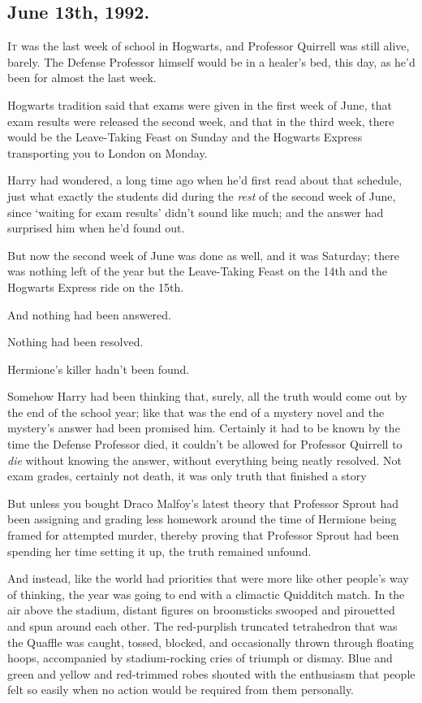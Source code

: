 
\subsection{June 13th, 1992.}

\lettrine{I}{t} was the last week of school in Hogwarts, and Professor Quirrell was still
alive, barely. The Defense Professor himself would be in a healer's bed, this
day, as he'd been for almost the last week.

Hogwarts tradition said that exams were given in the first week of June, that
exam results were released the second week, and that in the third week, there
would be the Leave-Taking Feast on Sunday and the Hogwarts Express transporting
you to London on Monday.

Harry had wondered, a long time ago when he'd first read about that schedule,
just what exactly the students did during the \emph{rest} of the second week of
June, since `waiting for exam results' didn't sound like much; and the answer
had surprised him when he'd found out.

But now the second week of June was done as well, and it was Saturday; there
was nothing left of the year but the Leave-Taking Feast on the 14th and the
Hogwarts Express ride on the 15th.

And nothing had been answered.

Nothing had been resolved.

Hermione's killer hadn't been found.

Somehow Harry had been thinking that, surely, all the truth would come out by
the end of the school year; like that was the end of a mystery novel and the
mystery's answer had been promised him. Certainly it had to be known by the
time the Defense Professor{\el} died, it couldn't be allowed for Professor
Quirrell to \emph{die} without knowing the answer, without everything being
neatly resolved. Not exam grades, certainly not death, it was only truth that
finished a story{\el}

But unless you bought Draco Malfoy's latest theory that Professor Sprout had
been assigning and grading less homework around the time of Hermione being
framed for attempted murder, thereby proving that Professor Sprout had been
spending her time setting it up, the truth remained unfound.

And instead, like the world had priorities that were more like other people's
way of thinking, the year was going to end with a climactic Quidditch match.
\sbreak
In the air above the stadium, distant figures on broomsticks swooped and
pirouetted and spun around each other. The red-purplish truncated tetrahedron
that was the Quaffle was caught, tossed, blocked, and occasionally thrown
through floating hoops, accompanied by stadium-rocking cries of triumph or
dismay. Blue and green and yellow and red-trimmed robes shouted with the
enthusiasm that people felt so easily when no action would be required from
them personally.

